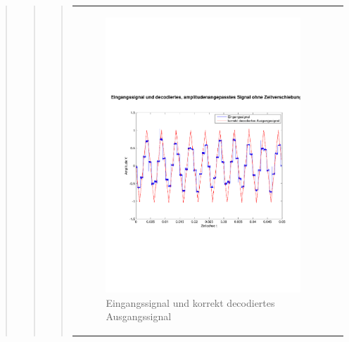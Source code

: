 \begin{quote}
\begin{quote}
\begin{quote}
\begin{center}
\begin{tabular}{ll}
                    \begin{minipage}{0.6\textwidth}
                        \begin{figure}[H]
                            \includegraphics[scale=0.4, trim = 0.8cm 7cm 0.8cm
                            8.5cm, clip]
                            {./Bilder/drei8_Eingang_vs_korrektDecodiert}
                              \caption{Eingangssignal und korrekt decodiertes
                              Ausgangssignal}
                        \end{figure}
                    \end{minipage}
                
                \end{tabular}
            \end{center}
            
            
            

\end{quote}
\end{quote}
\end{quote}
